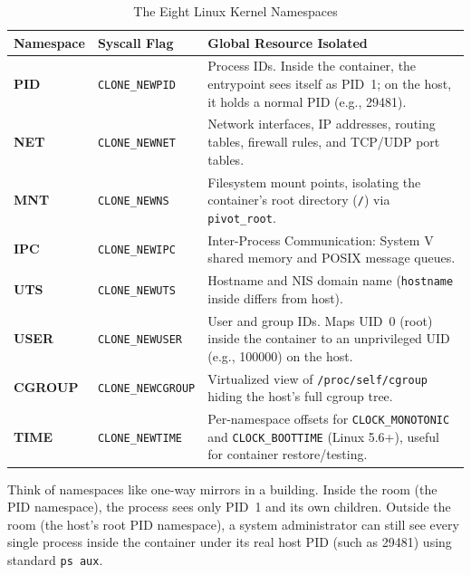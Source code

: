 \begin{table}[htbp]
\centering\small
\begin{tabular}{llp{7.4cm}}
\toprule
\textbf{Namespace} & \textbf{Syscall Flag} & \textbf{Global Resource Isolated} \\
\midrule
\textbf{PID} & \texttt{CLONE\_NEWPID} & Process IDs. Inside the container, the entrypoint sees itself as PID~1; on the host, it holds a normal PID (e.g., 29481). \\
\textbf{NET} & \texttt{CLONE\_NEWNET} & Network interfaces, IP addresses, routing tables, firewall rules, and TCP/UDP port tables. \\
\textbf{MNT} & \texttt{CLONE\_NEWNS} & Filesystem mount points, isolating the container's root directory (\texttt{/}) via \texttt{pivot\_root}. \\
\textbf{IPC} & \texttt{CLONE\_NEWIPC} & Inter-Process Communication: System V shared memory and POSIX message queues. \\
\textbf{UTS} & \texttt{CLONE\_NEWUTS} & Hostname and NIS domain name (\texttt{hostname} inside differs from host). \\
\textbf{USER} & \texttt{CLONE\_NEWUSER} & User and group IDs. Maps UID~0 (root) inside the container to an unprivileged UID (e.g., 100000) on the host. \\
\textbf{CGROUP} & \texttt{CLONE\_NEWCGROUP} & Virtualized view of \texttt{/proc/self/cgroup} hiding the host's full cgroup tree. \\
\textbf{TIME} & \texttt{CLONE\_NEWTIME} & Per-namespace offsets for \texttt{CLOCK\_MONOTONIC} and \texttt{CLOCK\_BOOTTIME} (Linux 5.6+), useful for container restore/testing. \\
\bottomrule
\end{tabular}
\caption{The Eight Linux Kernel Namespaces}
\label{tab:v3-ch02-namespaces}
\end{table}

\begin{intuitionbox}
Think of namespaces like one-way mirrors in a building. Inside the room (the PID namespace), the process sees only PID~1 and its own children. Outside the room (the host's root PID namespace), a system administrator can still see every single process inside the container under its real host PID (such as 29481) using standard \texttt{ps aux}.
\end{intuitionbox}

